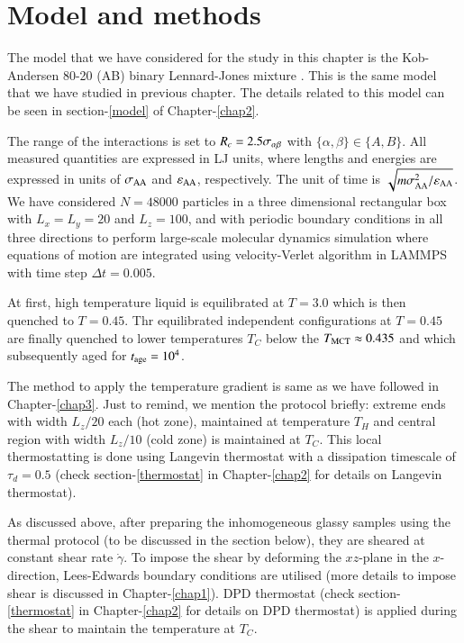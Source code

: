 \section{Model and methods}
The model that we have considered for the study in this chapter is the Kob-Andersen 80-20 (AB) binary Lennard-Jones mixture \cite{kob1995testing}. This is the same model that we have studied in previous chapter. The details related to this model can be seen in section-\ref{model} of Chapter-\ref{chap2}.

 The range of the interactions is set to $R_{c} = 2.5\sigma_{\rm{\alpha\beta}}$ with $\{\alpha,\beta\} \in \{A,B\}$. All measured quantities are expressed in LJ units, where lengths and energies are expressed in units of $\sigma_{\rm AA}$ and $\varepsilon_{\rm AA}$, respectively.  The unit of time is $\sqrt{{m\sigma_{\rm AA}^{2}}/\varepsilon_{\rm AA}}$. We have considered $N= 48 000$ particles in a three dimensional rectangular box with $L_x = L_y = 20$ and $L_z = 100$, and with periodic boundary conditions in all three directions to perform large-scale molecular dynamics simulation where equations of motion are integrated using velocity-Verlet algorithm in LAMMPS \cite{lammps} with time step $\Delta t = 0.005$. 
 
 At first, high temperature liquid is equilibrated at $T = 3.0$ which is then quenched to $T = 0.45$. Thr equilibrated independent configurations at $T = 0.45$ are finally quenched to lower temperatures $T_C$ below the $T_{\rm MCT} \approx 0.435$ and which subsequently aged for $t_{\rm age} = 10^4$.
 
 The method to apply the temperature gradient is same as we have followed in Chapter-\ref{chap3}. Just to remind, we mention the protocol briefly: extreme ends with width $L_z/20$ each (hot zone), maintained at temperature $T_H$ and central region with width $L_z/10$ (cold zone) is maintained at $T_C$. This local thermostatting is done using Langevin thermostat with a dissipation timescale of $\tau_d=0.5$ (check section-\ref{thermostat} in Chapter-\ref{chap2} for details on Langevin thermostat).
 
 As discussed above, after preparing the inhomogeneous glassy samples using the thermal protocol (to be discussed in the section below), they are sheared at constant shear rate $\dot{\gamma}$. To impose the shear by deforming the $xz$-plane in the $x$-direction, Lees-Edwards boundary conditions are utilised (more details to impose shear is discussed in Chapter-\ref{chap1}). DPD thermostat\cite{dpd} (check section-\ref{thermostat} in Chapter-\ref{chap2} for details on DPD thermostat) is applied during the shear to maintain the temperature at $T_C$.
 
